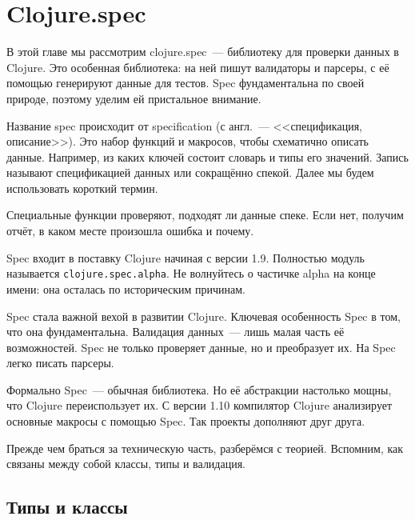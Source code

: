 \chapter{Clojure.spec}

\label{chapter-spec}


\begin{teaser}
В этой главе мы рассмотрим clojure.spec~--- библиотеку для проверки данных в
Clojure. Это особенная библиотека: на ней пишут валидаторы и парсеры, с её
помощью генерируют данные для тестов. Spec фундаментальна по своей природе,
поэтому уделим ей пристальное внимание.
\end{teaser}

Название spec происходит от specification (с англ.~--- <<спецификация, описание>>). Это
набор функций и макросов, чтобы схематично описать данные. Например, из каких
ключей состоит словарь и типы его значений. Запись называют спецификацией данных или
сокращённо спекой. Далее мы будем использовать короткий термин.

Специальные функции проверяют, подходят ли данные спеке. Если нет, получим
отчёт, в каком месте произошла ошибка и почему.


Spec входит в поставку Clojure начиная с версии 1.9. Полностью модуль называется
\texttt{clojure.\-spec.\-alpha}. Не волнуйтесь о частичке alpha на конце
имени: она осталась по историческим причинам.


Spec стала важной вехой в развитии Clojure. Ключевая особенность Spec в том, что
она фундаментальна. Валидация данных~--- лишь малая часть её возможностей. Spec
не только проверяет данные, но и преобразует их. На Spec легко писать парсеры.

Формально Spec~--- обычная библиотека. Но её абстракции настолько мощны, что
Clojure переиспользует их. С версии 1.10 компилятор Clojure анализирует основные
макросы с помощью Spec. Так проекты дополняют друг друга.

Прежде чем браться за техническую часть, разберёмся с теорией. Вспомним, как
связаны между собой классы, типы и валидация.

\section{Типы и классы}

\label{type-and-pred}

